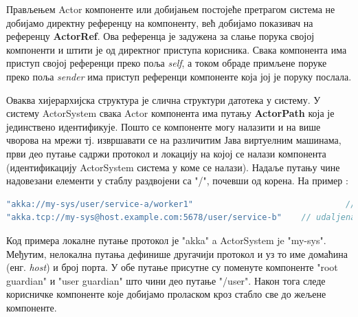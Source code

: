 \documentclass[12pt,oneside]{memoir}
\begin{document}
Прављењем Actor компоненте или добијањем постојеће претрагом система не добијамо директну референцу на компоненту, већ добијамо показивач на референцу \textbf{ActorRef}. Ова референца је задужена за слање порука својој компоненти и штити је од директног приступа корисника. Свака компонента има приступ својој референци преко поља \textit{self}, а током обраде примљене поруке преко поља \textit{sender} има приступ референци компоненте која јој је поруку послала.

Оваква хијерархијска структура је слична структури датотека у систему. У систему ActorSystem свака Actor компонента има путању \textbf{ActorPath} која је јединствено идентификује. Пошто се компоненте могу налазити и на више чворова на мрежи тј. извршавати се на различитим Јава виртуелним машинама, први део путање садржи протокол и локацију на којој се налази компонента (идентификацију ActorSystem система у коме се налази). Надаље путању чине надовезани елементи у стаблу раздвојени са "/", почевши од корена. На пример \cite{akkaDoc}:
\begin{lstlisting}[language=Scala]
"akka://my-sys/user/service-a/worker1"                  		   	 // lokalna komponenta
"akka.tcp://my-sys@host.example.com:5678/user/service-b" 	// udaljena komponenta
\end{lstlisting}
Код примера локалне путање протокол је "akka" a ActorSystem je "my-sys". Међутим, нелокална путања дефинише другачији протокол и уз то име домаћина (енг. \textit{host}) и број порта. У обе путање присутне су поменуте компоненте "root guardian" и "user guardian" што чини део путање "/user". Након тога следе корисничке компоненте које добијамо проласком кроз стабло све до жељене компоненте.
\end{document}
